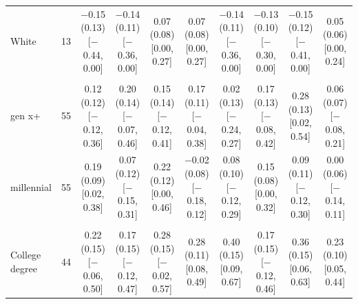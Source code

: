 \begin{table}[t]
\begin{tabular}{@{}lr*{8}{c}@{}}
\quad White & 13 & \makecell{$-$0.15 (0.13)\\ {[}$-$0.44, 0.00{]}} & \makecell{$-$0.14 (0.11)\\ {[}$-$0.36, 0.00{]}} & \makecell{0.07 (0.08)\\ {[}0.00, 0.27{]}} & \makecell{0.07 (0.08)\\ {[}0.00, 0.27{]}} & \makecell{$-$0.14 (0.11)\\ {[}$-$0.36, 0.00{]}} & \makecell{$-$0.13 (0.10)\\ {[}$-$0.30, 0.00{]}} & \makecell{$-$0.15 (0.12)\\ {[}$-$0.41, 0.00{]}} & \makecell{0.05 (0.06)\\ {[}0.00, 0.24{]}} \\
\addlinespace
\multicolumn{10}{@{}l}{\textit{Age (D)}} \\
\quad gen x+ & 55 & \makecell{0.12 (0.12)\\ {[}$-$0.12, 0.36{]}} & \makecell{0.20 (0.14)\\ {[}$-$0.07, 0.46{]}} & \makecell{0.15 (0.14)\\ {[}$-$0.12, 0.41{]}} & \makecell{0.17 (0.11)\\ {[}$-$0.04, 0.38{]}} & \makecell{0.02 (0.13)\\ {[}$-$0.24, 0.27{]}} & \makecell{0.17 (0.13)\\ {[}$-$0.08, 0.42{]}} & \makecell{0.28 (0.13)\\ {[}0.02, 0.54{]}} & \makecell{0.06 (0.07)\\ {[}$-$0.08, 0.21{]}} \\
\quad millennial & 55 & \makecell{0.19 (0.09)\\ {[}0.02, 0.38{]}} & \makecell{0.07 (0.12)\\ {[}$-$0.15, 0.31{]}} & \makecell{0.22 (0.12)\\ {[}0.00, 0.46{]}} & \makecell{$-$0.02 (0.08)\\ {[}$-$0.18, 0.12{]}} & \makecell{0.08 (0.10)\\ {[}$-$0.12, 0.29{]}} & \makecell{0.15 (0.08)\\ {[}0.00, 0.32{]}} & \makecell{0.09 (0.11)\\ {[}$-$0.12, 0.30{]}} & \makecell{0.00 (0.06)\\ {[}$-$0.14, 0.11{]}} \\
\addlinespace
\multicolumn{10}{@{}l}{\textit{Education (N)}} \\
\quad College degree & 44 & \makecell{0.22 (0.15)\\ {[}$-$0.06, 0.50{]}} & \makecell{0.17 (0.15)\\ {[}$-$0.12, 0.47{]}} & \makecell{0.28 (0.15)\\ {[}$-$0.02, 0.57{]}} & \makecell{0.28 (0.11)\\ {[}0.08, 0.49{]}} & \makecell{0.40 (0.15)\\ {[}0.09, 0.67{]}} & \makecell{0.17 (0.15)\\ {[}$-$0.12, 0.46{]}} & \makecell{0.36 (0.15)\\ {[}0.06, 0.63{]}} & \makecell{0.23 (0.10)\\ {[}0.05, 0.44{]}} \\

\end{tabular}
\end{table}
